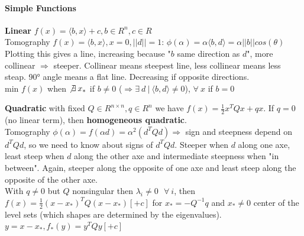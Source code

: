 \documentclass[10pt]{report}
\begin{document}
\paragraph{Simple Functions} \begin{list}{}{}
	\item \textbf{Linear} $f(x) = \langle b,x\rangle + c, b \in R^n, c\in R$\\
	Tomography $f(x) = \langle b,x\rangle, x = 0, ||d||=1$: $\phi(\alpha) = \alpha\langle b, d\rangle = \alpha||b||cos(\theta)$\\
	Plotting this gives a line, increasing because "$b$ same direction as $d$", more collinear $\Rightarrow$ steeper. Collinear means steepest line, less collinear means less steap. 90° angle means a flat line. Decreasing if opposite directions.\\
	min $f(x)$ when $\not\exists\:x_*$ if $b \neq 0$ ($\Rightarrow \exists\: d\:|\:\langle b,d\rangle \neq 0$), $\forall\:x$ if $b = 0$
	\item \textbf{Quadratic} with fixed $Q\in R^{n\times n}, q\in R^n$ we have $f(x) = \frac{1}{2}x^TQx + qx$. If $q=0$ (no linear term), then \textbf{homogeneous quadratic}.\\
	Tomography $\phi(\alpha) = f(\alpha d) = \alpha^2(d^TQd)\Rightarrow$ sign and steepness depend on $d^TQd$, so we need to know about signs of $d^TQd$. Steeper when $d$ along one axe, least steep when $d$ along the other axe and intermediate steepness when "in between". Again, steeper along the opposite of one axe and least steep along the opposite of the other axe.\\
	With $q\neq 0$ but $Q$ nonsingular then $\lambda_i\neq 0\:\:\:\forall\:i$, then $f(x)=\frac{1}{2}(x-x_*)^TQ(x-x_*) [+c]$ for $x_* = -Q^{-1}q$ and $x_* \neq 0$ center of the level sets (which shapes are determined by the eigenvalues).\\
	$y = x - x_*, f_*(y) = y^TQy [+c]$
\end{list}
\end{document}

